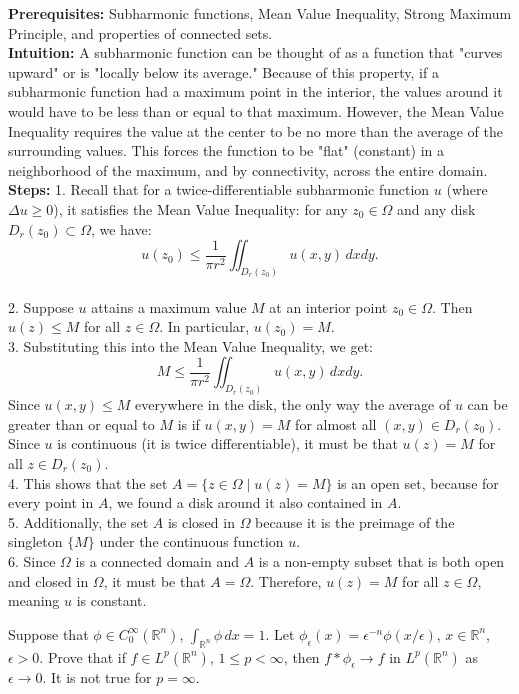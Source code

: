 \begin{solution}
\textbf{Prerequisites:} Subharmonic functions, Mean Value Inequality, Strong Maximum Principle, and properties of connected sets. \\[2ex]
\textbf{Intuition:} A subharmonic function can be thought of as a function that "curves upward" or is "locally below its average." Because of this property, if a subharmonic function had a maximum point in the interior, the values around it would have to be less than or equal to that maximum. However, the Mean Value Inequality requires the value at the center to be no more than the average of the surrounding values. This forces the function to be "flat" (constant) in a neighborhood of the maximum, and by connectivity, across the entire domain. \\[2ex]
\textbf{Steps:}
1. Recall that for a twice-differentiable subharmonic function $u$ (where $\Delta u \geq 0$), it satisfies the Mean Value Inequality: for any $z_0 \in \Omega$ and any disk $D_r(z_0) \subset \Omega$, we have:
\[
u(z_0) \leq \frac{1}{\pi r^2} \iint_{D_r(z_0)} u(x,y) \, dx dy.
\] \\[2ex]
2. Suppose $u$ attains a maximum value $M$ at an interior point $z_0 \in \Omega$. Then $u(z) \leq M$ for all $z \in \Omega$. In particular, $u(z_0) = M$. \\[2ex]
3. Substituting this into the Mean Value Inequality, we get:
\[
M \leq \frac{1}{\pi r^2} \iint_{D_r(z_0)} u(x,y) \, dx dy.
\]
Since $u(x,y) \leq M$ everywhere in the disk, the only way the average of $u$ can be greater than or equal to $M$ is if $u(x,y) = M$ for almost all $(x,y) \in D_r(z_0)$. Since $u$ is continuous (it is twice differentiable), it must be that $u(z) = M$ for all $z \in D_r(z_0)$. \\[2ex]
4. This shows that the set $A = \{z \in \Omega \mid u(z) = M\}$ is an open set, because for every point in $A$, we found a disk around it also contained in $A$. \\[2ex]
5. Additionally, the set $A$ is closed in $\Omega$ because it is the preimage of the singleton $\{M\}$ under the continuous function $u$. \\[2ex]
6. Since $\Omega$ is a connected domain and $A$ is a non-empty subset that is both open and closed in $\Omega$, it must be that $A = \Omega$. Therefore, $u(z) = M$ for all $z \in \Omega$, meaning $u$ is constant.
\end{solution}

\begin{exercise}
\label{analysis:2014:12}
Suppose that $\phi\in C_0^{\infty}(\mathbb{R}^n)$, $\int_{\mathbb{R}^n}\phi\,dx = 1$. Let $\phi_{\epsilon}(x) = \epsilon^{-n}\phi(x/\epsilon)$, $x\in\mathbb{R}^n$, $\epsilon>0$. Prove that if $f\in L^p(\mathbb{R}^n)$, $1\leq p < \infty$, then $f*\phi_{\epsilon}\to f$ in $L^p(\mathbb{R}^n)$ as $\epsilon\to 0$. It is not true for $p=\infty$.
\end{exercise}

